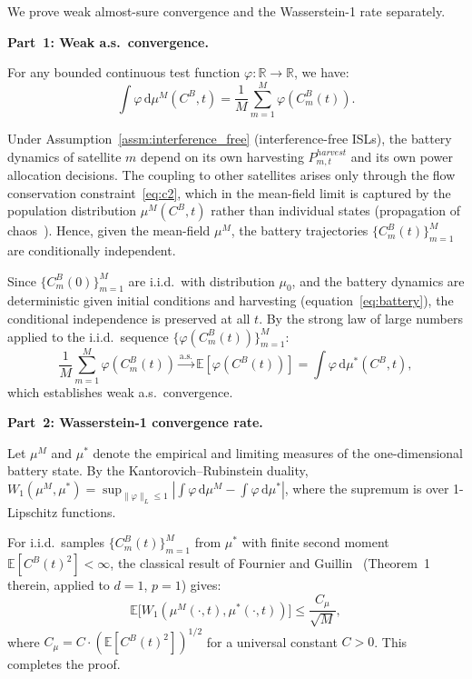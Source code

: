 \documentclass[journal]{IEEEtran}
\newcommand{\CB}{C^{B}}
\begin{document}
\begin{IEEEproof}
We prove weak almost-sure convergence and the Wasserstein-1 rate separately.

\smallskip
\noindent\textbf{Part~1: Weak a.s.\ convergence.}

For any bounded continuous test function $\varphi : \mathbb{R} \to \mathbb{R}$, we have:
\begin{equation}
    \int \varphi \,\mathrm{d}\mu^M(\CB, t)
    = \frac{1}{M}
    \sum_{m=1}^{M} \varphi(\CB_m(t)).
    \label{eq:lln_test}
\end{equation}

Under Assumption~\ref{assm:interference_free} (interference-free ISLs), the battery dynamics of satellite $m$ depend on its own harvesting $P_{m,t}^{harvest}$ and its own power allocation decisions. The coupling to other satellites arises only through the flow conservation constraint~\eqref{eq:c2}, which in the mean-field limit is captured by the population distribution $\mu^M(\CB, t)$ rather than individual states (propagation of chaos~\cite{lasry2007mfg}). Hence, given the mean-field $\mu^M$, the battery trajectories $\{\CB_m(t)\}_{m=1}^M$ are conditionally independent.

Since $\{\CB_m(0)\}_{m=1}^M$ are i.i.d.\ with distribution $\mu_0$, and the battery dynamics are deterministic given initial conditions and harvesting (equation~\eqref{eq:battery}), the conditional independence is preserved at all $t$. By the strong law of large numbers applied to the i.i.d.\ sequence $\{\varphi(\CB_m(t))\}_{m=1}^M$:
\begin{equation}
    \frac{1}{M}
    \sum_{m=1}^{M} \varphi(\CB_m(t))
    \xrightarrow{\mathrm{a.s.}}
    \mathbb{E}[\varphi(\CB(t))]
    = \int \varphi \,\mathrm{d}\mu^*(\CB, t),
\end{equation}
which establishes weak a.s.\ convergence.

\smallskip
\noindent\textbf{Part~2: Wasserstein-1 convergence
rate.}

Let $\mu^M$ and $\mu^*$ denote the empirical and limiting measures of the one-dimensional battery state. By the Kantorovich--Rubinstein duality, $W_1(\mu^M, \mu^*) = \sup_{\|\varphi\|_L \leq 1} |\int \varphi \,\mathrm{d}\mu^M - \int \varphi \,\mathrm{d}\mu^*|$, where the supremum is over 1-Lipschitz functions.

For i.i.d.\ samples $\{\CB_m(t)\}_{m=1}^M$ from $\mu^*$ with finite second moment $\mathbb{E}[\CB(t)^2] < \infty$, the classical result of Fournier and Guillin~\cite{fournier2015wasserstein} (Theorem~1 therein, applied to $d=1$, $p=1$) gives:
\begin{equation}
    \mathbb{E}\bigl[
    W_1(\mu^M(\cdot, t), \mu^*(\cdot, t))
    \bigr]
    \leq \frac{C_\mu}{\sqrt{M}},
\end{equation}
where $C_\mu = C \cdot (\mathbb{E}[\CB(t)^2])^{1/2}$ for a universal constant $C > 0$. This completes the proof.

\end{IEEEproof}
\end{document}
